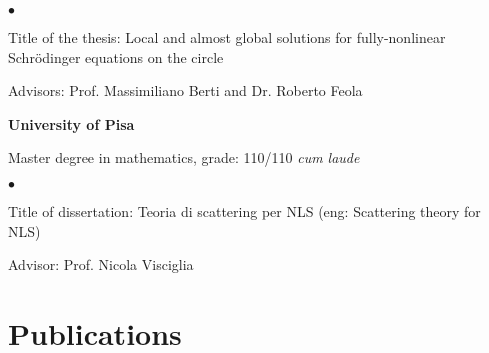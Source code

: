 \documentclass[margin,line,pifont,palatino,courier]{res}
\newenvironment{list1}{
  \begin{list}{\ding{113}}{%
      \setlength{\itemsep}{0in}
      \setlength{\parsep}{0in} \setlength{\parskip}{0in}
      \setlength{\topsep}{0in} \setlength{\partopsep}{0in}
      \setlength{\leftmargin}{0.17in}}}{\end{list}}
\newenvironment{list2}{
  \begin{list}{$\bullet$}{%
      \setlength{\itemsep}{0in}
      \setlength{\parsep}{0in} \setlength{\parskip}{0in}
      \setlength{\topsep}{0in} \setlength{\partopsep}{0in}
      \setlength{\leftmargin}{0.2in}}}{\end{list}}
\begin{document}
\begin{resume}
\begin{list1}
\begin{list2}
\vspace*{.05in}
\item Title of the thesis:  Local and almost global solutions for  fully-nonlinear Schr\"odinger equations on the circle
\item Advisors:  Prof. Massimiliano Berti and Dr. Roberto Feola
\end{list2}
\end{list1}

{\bf University of Pisa}\\
\vspace*{-.1in}
\begin{list1}
\item[] Master degree in mathematics, grade: 110/110 \emph{cum laude}

\begin{list2}
\vspace*{.05in}
\item Title of dissertation: Teoria di scattering per NLS (eng: Scattering theory for NLS)
\item Advisor: Prof. Nicola Visciglia
\end{list2}

\end{list1}






\section{\sc Publications}


\end{resume}
\end{document}

